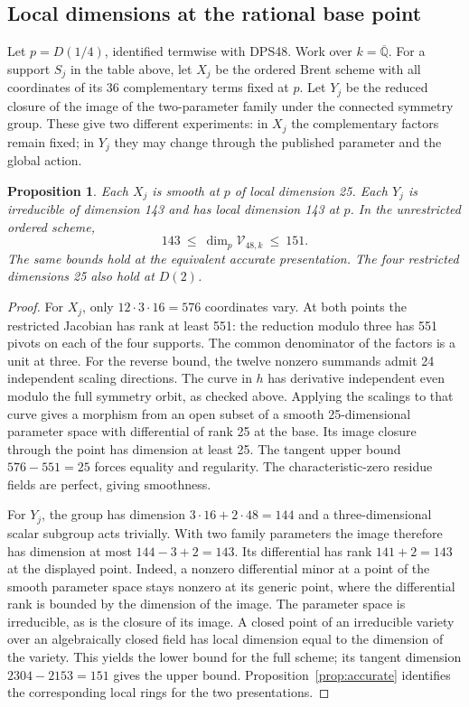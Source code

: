 \documentclass[11pt,reqno]{amsart}
\newcommand{\Q}{\mathbb Q}
\newcommand{\Brent}{\mathcal V}
\newtheorem{proposition}[theorem]{Proposition}
\begin{document}
\subsection*{Local dimensions at the rational base point}
Let \(p=D(1/4)\), identified termwise with DPS48. Work over \(k=\overline{\Q}\). For a support \(S_j\) in the table above, let \(X_j\) be the ordered Brent scheme with all coordinates of its 36 complementary terms fixed at \(p\). Let \(Y_j\) be the reduced closure of the image of the two-parameter family under the connected symmetry group. These give two different experiments: in \(X_j\) the complementary factors remain fixed; in \(Y_j\) they may change through the published parameter and the global action.

\begin{proposition}\label{prop:dimensions}
Each \(X_j\) is smooth at \(p\) of local dimension 25. Each \(Y_j\) is irreducible of dimension 143 and has local dimension 143 at \(p\). In the unrestricted ordered scheme,
\[
                 143\ \leq\ \dim_p\Brent_{48,k}\ \leq\ 151 .
\]
The same bounds hold at the equivalent accurate presentation. The four restricted dimensions 25 also hold at \(D(2)\).
\end{proposition}
\begin{proof}
For \(X_j\), only \(12\cdot 3\cdot16=576\) coordinates vary. At both points the restricted Jacobian has rank at least 551: the reduction modulo three has 551 pivots on each of the four supports. The common denominator of the factors is a unit at three. For the reverse bound, the twelve nonzero summands admit 24 independent scaling directions. The curve in \(h\) has derivative independent even modulo the full symmetry orbit, as checked above. Applying the scalings to that curve gives a morphism from an open subset of a smooth 25-dimensional parameter space with differential of rank 25 at the base. Its image closure through the point has dimension at least 25. The tangent upper bound \(576-551=25\) forces equality and regularity. The characteristic-zero residue fields are perfect, giving smoothness.

For \(Y_j\), the group has dimension \(3\cdot16+2\cdot48=144\) and a three-dimensional scalar subgroup acts trivially. With two family parameters the image therefore has dimension at most \(144-3+2=143\). Its differential has rank \(141+2=143\) at the displayed point. Indeed, a nonzero differential minor at a point of the smooth parameter space stays nonzero at its generic point, where the differential rank is bounded by the dimension of the image. The parameter space is irreducible, as is the closure of its image. A closed point of an irreducible variety over an algebraically closed field has local dimension equal to the dimension of the variety. This yields the lower bound for the full scheme; its tangent dimension \(2304-2153=151\) gives the upper bound. Proposition~\ref{prop:accurate} identifies the corresponding local rings for the two presentations.
\end{proof}
\end{document}
